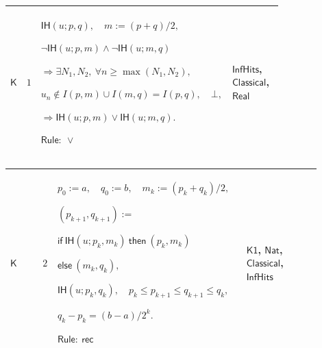 \documentclass[12pt,reqno]{amsart}
\theoremstyle{blueplain}
\numberwithin{equation}{section}
\newlength{\FTCOneColumnBody}
\begin{document}
{\scriptsize \setlength{\parskip}{0pt}\nointerlineskip
\noindent 
\begin{tabular}{|@{}>{\centering\arraybackslash}m{\FTCOneColumnBody}|}
\hline
$\displaystyle \mathsf{Context\_K}:=$\par$\displaystyle a\le b,\quad u:%
\mathsf{Nat}\to\mathsf{Real},\quad\forall n,\ u_n\in I(a,b).$ \\ \hline
\end{tabular}%
}

{\scriptsize \setlength{\parskip}{0pt}\nointerlineskip
\noindent 
\begin{tabular}{|@{}>{\centering\arraybackslash}m{0.10658\linewidth}|>{\centering\arraybackslash}m{0.03553\linewidth}|>{\centering\arraybackslash}m{0.52105\linewidth}|>{\centering\arraybackslash}m{0.23684\linewidth}|}
\hline
\hypertarget{proof:K1}{$\displaystyle \mathsf{K}$} & $\displaystyle 1$ & $%
\displaystyle \mathsf{IH}(u;p,q),\quad m:=(p+q)/2,$\par$\displaystyle \neg%
\mathsf{IH}(u;p,m)\land\neg\mathsf{IH}(u;m,q)$\par$\displaystyle %
\Rightarrow\exists N_1,N_2,\ \forall n\ge\max(N_1,N_2),$\par$\displaystyle %
u_n\notin I(p,m)\cup I(m,q)=I(p,q),\quad\bot,$\par$\displaystyle \Rightarrow%
\mathsf{IH}(u;p,m)\lor\mathsf{IH}(u;m,q).$\par$\displaystyle \mathsf{Rule}:\
\lor$ & \hyperlink{def:InfHits}{$\displaystyle \mathsf{InfHits}$}, 
\hyperlink{ax:Classical}{$\displaystyle \mathsf{Classical}$}, \hyperlink{ax:Real}%
{$\displaystyle \mathsf{Real}$} \\ \hline
\end{tabular}%
}

{\scriptsize \setlength{\parskip}{0pt}\nointerlineskip
\noindent 
\begin{tabular}{|@{}>{\centering\arraybackslash}m{0.10658\linewidth}|>{\centering\arraybackslash}m{0.03553\linewidth}|>{\centering\arraybackslash}m{0.52105\linewidth}|>{\centering\arraybackslash}m{0.23684\linewidth}|}
\hline
\hypertarget{proof:K2}{$\displaystyle \mathsf{K}$} & $\displaystyle 2$ & $%
\displaystyle p_0:=a,\quad q_0:=b,\quad m_k:=(p_k+q_k)/2,$\par$\displaystyle %
(p_{k+1},q_{k+1}):=$\par$\displaystyle \mathsf{if}\ \mathsf{IH}(u;p_k,m_k)\ 
\mathsf{then}\ (p_k,m_k)$\par$\displaystyle \mathsf{else}\ (m_k,q_k),$\par$%
\displaystyle \mathsf{IH}(u;p_k,q_k),\quad p_k\le p_{k+1}\le q_{k+1}\le q_k,$%
\par$\displaystyle q_k-p_k=(b-a)/2^k.$\par$\displaystyle \mathsf{Rule}:\ 
\mathsf{rec}$ & \hyperlink{proof:K1}{$\displaystyle \mathsf{K1}$}, 
\hyperlink{ax:Nat}{$\displaystyle \mathsf{Nat}$}, \hyperlink{ax:Classical}{$%
\displaystyle \mathsf{Classical}$}, \hyperlink{def:InfHits}{$\displaystyle 
\mathsf{InfHits}$} \\ \hline
\end{tabular}%
}
\end{document}
